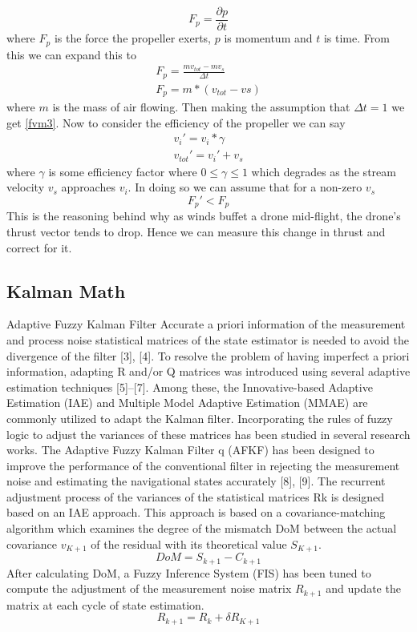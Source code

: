 \documentclass[conference]{IEEEtran}
\begin{document}
	\begin{equation}
	F_p= \frac{\partial p}{\partial t}
	\label{fvm}
	\end{equation}
	where $F_p$ is the force the propeller exerts, $p$ is momentum and $t$ is time. From this we can expand this to 
	\begin{eqnarray}
	F_p= \frac{mv_{tot} - mv_{s}}{\Delta t}\\ 
	\label{fvm2}
	F_p= m*(v_{tot}-v{s}) 
	\label{fvm3}
	\end{eqnarray}
	where $m$ is the mass of air flowing. Then making the assumption that $\Delta t = 1$ we get \ref{fvm3}.	Now to consider the efficiency of the propeller we can say 
	\begin{eqnarray}	
	v_{i}\prime = v_{i}* \gamma\\
	v_{tot}\prime = v_i\prime + v_s
	\label{eff}
	\end{eqnarray}
	where $\gamma$ is some efficiency factor where $0 \leq  \gamma \leq 1$ which degrades as the stream velocity $v_s$ approaches $v_i$\cite{someone}. In doing so we can assume that for a non-zero $v_s$ 
	\begin{equation}
	F_p\prime < F_p
	\end{equation}
	This is the reasoning behind why as winds buffet a drone mid-flight, the drone's thrust vector tends to drop. Hence we can measure this change in thrust and correct for it.
	\subsection{Kalman Math}
	Adaptive Fuzzy Kalman Filter 
	Accurate a priori information of the measurement and process noise statistical matrices of the state estimator is needed to avoid the divergence of the filter [3], [4]. To resolve the problem of having imperfect a priori information, adapting R and/or Q matrices was introduced using several adaptive estimation techniques [5]–[7]. Among these, the Innovative-based Adaptive Estimation (IAE) and Multiple Model Adaptive Estimation (MMAE) are commonly utilized to adapt the Kalman filter. Incorporating the rules of fuzzy logic to adjust the variances of these matrices has been studied in several research works. The Adaptive Fuzzy Kalman Filter q (AFKF) has been designed to improve the performance of the conventional filter in rejecting the measurement noise and estimating the navigational states accurately [8], [9]. 
	The recurrent adjustment process of the variances of the statistical matrices Rk is designed based on an IAE approach. This approach is based on a covariance-matching algorithm which examines the degree of the mismatch DoM between the actual covariance $v_{K+1}$ of the residual with its theoretical value $S_{K+1}$. 
	\begin{equation}
	DoM = S_{k+1} - C_{k+1}
	\label{dom}
	\end{equation}
	After calculating DoM, a Fuzzy Inference System (FIS) has been tuned to compute the adjustment of the measurement noise matrix $R_{k+1}$ and update the matrix at each cycle of state estimation.
	\begin{equation}
	R_{k+1} = R_k +\delta R_{K+1}
	\label{rk1}
	\end{equation} 
\end{document}
